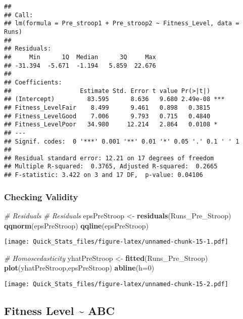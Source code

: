 \documentclass[]{article}
\newenvironment{Shaded}{\begin{snugshade}}{\end{snugshade}}
\newcommand{\KeywordTok}[1]{\textcolor[rgb]{0.13,0.29,0.53}{\textbf{#1}}}
\newcommand{\DataTypeTok}[1]{\textcolor[rgb]{0.13,0.29,0.53}{#1}}
\newcommand{\DecValTok}[1]{\textcolor[rgb]{0.00,0.00,0.81}{#1}}
\newcommand{\StringTok}[1]{\textcolor[rgb]{0.31,0.60,0.02}{#1}}
\newcommand{\CommentTok}[1]{\textcolor[rgb]{0.56,0.35,0.01}{\textit{#1}}}
\newcommand{\NormalTok}[1]{#1}
\begin{document}
\begin{verbatim}
## 
## Call:
## lm(formula = Pre_stroop1 + Pre_stroop2 ~ Fitness_Level, data = Runs)
## 
## Residuals:
##     Min      1Q  Median      3Q     Max 
## -31.394  -5.671  -1.194   5.859  22.676 
## 
## Coefficients:
##                   Estimate Std. Error t value Pr(>|t|)    
## (Intercept)         83.595      8.636   9.680 2.49e-08 ***
## Fitness_LevelFair    8.499      9.461   0.898   0.3815    
## Fitness_LevelGood    7.006      9.793   0.715   0.4840    
## Fitness_LevelPoor   34.980     12.214   2.864   0.0108 *  
## ---
## Signif. codes:  0 '***' 0.001 '**' 0.01 '*' 0.05 '.' 0.1 ' ' 1
## 
## Residual standard error: 12.21 on 17 degrees of freedom
## Multiple R-squared:  0.3765, Adjusted R-squared:  0.2665 
## F-statistic: 3.422 on 3 and 17 DF,  p-value: 0.04106
\end{verbatim}

\subsubsection{Checking Validity}\label{checking-validity-2}

\begin{Shaded}
\begin{Highlighting}[]
\CommentTok{# Residuals }
\CommentTok{# Residuals }
\NormalTok{epsPreStroop <-}\StringTok{ }\KeywordTok{residuals}\NormalTok{(Runs_Pre_Stroop) }
\KeywordTok{qqnorm}\NormalTok{(epsPreStroop) }
\KeywordTok{qqline}\NormalTok{(epsPreStroop) }
\end{Highlighting}
\end{Shaded}

\texttt{[image: Quick\_Stats\_files/figure-latex/unnamed-chunk-15-1.pdf]}

\begin{Shaded}
\begin{Highlighting}[]
\CommentTok{# Homoscedasticity }
\NormalTok{yhatPreStroop <-}\StringTok{ }\KeywordTok{fitted}\NormalTok{(Runs_Pre_Stroop) }
\KeywordTok{plot}\NormalTok{(yhatPreStroop,epsPreStroop) }
\KeywordTok{abline}\NormalTok{(}\DataTypeTok{h=}\DecValTok{0}\NormalTok{) }
\end{Highlighting}
\end{Shaded}

\texttt{[image: Quick\_Stats\_files/figure-latex/unnamed-chunk-15-2.pdf]}

\subsection{Fitness Level \textasciitilde{}
ABC}\label{fitness-level-abc}
\end{document}
